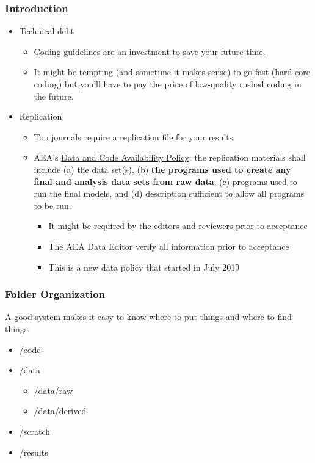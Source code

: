 \documentclass{beamer}
\begin{document}
\frame
{
\frametitle{Introduction}

\begin{itemize}
	\item Technical debt
	\begin{itemize}
		\item Coding guidelines are an investment to save your future time. 
		\item It might be tempting (and sometime it makes sense) to go fast (hard-core coding) but you'll have to pay the price of low-quality rushed coding in the future.
	\end{itemize}
\vspace{0.2cm}
\item Replication
\begin{itemize}
	\item Top journals require  a replication file for your results.
	\item AEA's \href{https://www.aeaweb.org/journals/policies/data-code/}{Data and Code Availability Policy}: the replication materials shall include (a) the data set(s), (b) \textbf{the programs used to create any final and analysis data sets from raw data}, (c) programs used to run the final models, and (d) description sufficient to allow all programs to be run.
	\begin{itemize}
		\item It might be required by the editors and reviewers prior to acceptance
		\item The AEA Data Editor verify all information prior to acceptance
		\item This is a new data policy that started in July 2019
	\end{itemize}

\end{itemize}
\end{itemize}


}


\frame
{
	\frametitle{Folder Organization}

A good system makes it easy to know where to put things and where to find things: \newline
	\begin{itemize}
		\item[] /code
		\item[] /data
		\begin{itemize}
			\item[] /data/raw
			\item[] /data/derived
		\end{itemize}
		\item[] /scratch
		\item[] /results
	\end{itemize}
	
	
}
\end{document}
